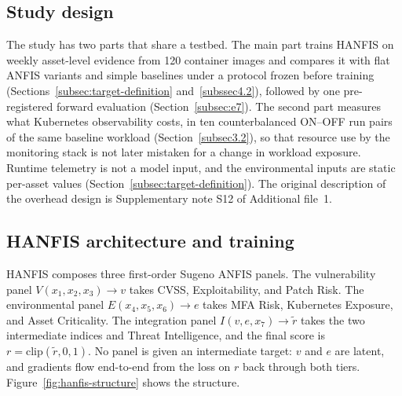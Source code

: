 \documentclass[referee,lineno,pdflatex,sn-basic]{sn-jnl}%
\theoremstyle{thmstyleone}%
\theoremstyle{thmstyletwo}%
\theoremstyle{thmstylethree}%
\begin{document}
\subsection{Study design}
\label{subsec3.1}

The study has two parts that share a testbed. The main part trains HANFIS on weekly asset-level evidence from 120 container images and compares it with flat ANFIS variants and simple baselines under a protocol frozen before training (Sections~\ref{subsec:target-definition} and~\ref{subssec4.2}), followed by one pre-registered forward evaluation (Section~\ref{subsec:e7}). The second part measures what Kubernetes observability costs, in ten counterbalanced ON--OFF run pairs of the same baseline workload (Section~\ref{subsec3.2}), so that resource use by the monitoring stack is not later mistaken for a change in workload exposure. Runtime telemetry is not a model input, and the environmental inputs are static per-asset values (Section~\ref{subsec:target-definition}). The original description of the overhead design is Supplementary note S12 of Additional file~1.

\subsection{HANFIS architecture and training}
\label{subsec:hanfis-architecture}

HANFIS composes three first-order Sugeno ANFIS panels. The vulnerability panel $V(x_1,x_2,x_3)\to v$ takes CVSS, Exploitability, and Patch Risk. The environmental panel $E(x_4,x_5,x_6)\to e$ takes MFA Risk, Kubernetes Exposure, and Asset Criticality. The integration panel $I(v,e,x_7)\to \tilde r$ takes the two intermediate indices and Threat Intelligence, and the final score is $r=\mathrm{clip}(\tilde r,0,1)$.
No panel is given an intermediate target: $v$ and $e$ are latent, and gradients flow end-to-end from the
loss on $r$ back through both tiers. Figure~\ref{fig:hanfis-structure} shows the structure.
\end{document}
